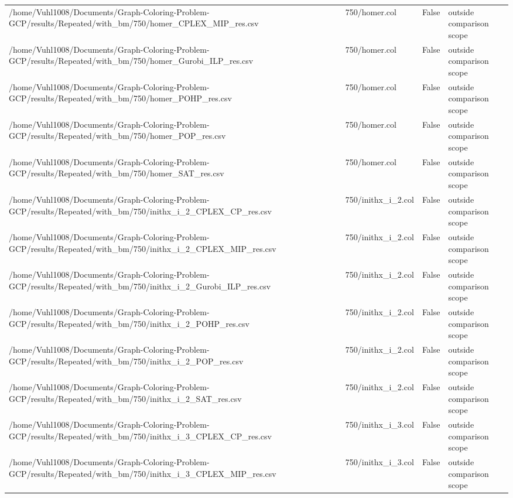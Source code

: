 \begin{table}[htbp]
\begin{tabular}{llll}
/home/Vuhl1008/Documents/Graph-Coloring-Problem-GCP/results/Repeated/with\_bm/750/homer\_CPLEX\_MIP\_res.csv & 750/homer.col & False & outside comparison scope \\
/home/Vuhl1008/Documents/Graph-Coloring-Problem-GCP/results/Repeated/with\_bm/750/homer\_Gurobi\_ILP\_res.csv & 750/homer.col & False & outside comparison scope \\
/home/Vuhl1008/Documents/Graph-Coloring-Problem-GCP/results/Repeated/with\_bm/750/homer\_POHP\_res.csv & 750/homer.col & False & outside comparison scope \\
/home/Vuhl1008/Documents/Graph-Coloring-Problem-GCP/results/Repeated/with\_bm/750/homer\_POP\_res.csv & 750/homer.col & False & outside comparison scope \\
/home/Vuhl1008/Documents/Graph-Coloring-Problem-GCP/results/Repeated/with\_bm/750/homer\_SAT\_res.csv & 750/homer.col & False & outside comparison scope \\
/home/Vuhl1008/Documents/Graph-Coloring-Problem-GCP/results/Repeated/with\_bm/750/inithx\_i\_2\_CPLEX\_CP\_res.csv & 750/inithx\_i\_2.col & False & outside comparison scope \\
/home/Vuhl1008/Documents/Graph-Coloring-Problem-GCP/results/Repeated/with\_bm/750/inithx\_i\_2\_CPLEX\_MIP\_res.csv & 750/inithx\_i\_2.col & False & outside comparison scope \\
/home/Vuhl1008/Documents/Graph-Coloring-Problem-GCP/results/Repeated/with\_bm/750/inithx\_i\_2\_Gurobi\_ILP\_res.csv & 750/inithx\_i\_2.col & False & outside comparison scope \\
/home/Vuhl1008/Documents/Graph-Coloring-Problem-GCP/results/Repeated/with\_bm/750/inithx\_i\_2\_POHP\_res.csv & 750/inithx\_i\_2.col & False & outside comparison scope \\
/home/Vuhl1008/Documents/Graph-Coloring-Problem-GCP/results/Repeated/with\_bm/750/inithx\_i\_2\_POP\_res.csv & 750/inithx\_i\_2.col & False & outside comparison scope \\
/home/Vuhl1008/Documents/Graph-Coloring-Problem-GCP/results/Repeated/with\_bm/750/inithx\_i\_2\_SAT\_res.csv & 750/inithx\_i\_2.col & False & outside comparison scope \\
/home/Vuhl1008/Documents/Graph-Coloring-Problem-GCP/results/Repeated/with\_bm/750/inithx\_i\_3\_CPLEX\_CP\_res.csv & 750/inithx\_i\_3.col & False & outside comparison scope \\
/home/Vuhl1008/Documents/Graph-Coloring-Problem-GCP/results/Repeated/with\_bm/750/inithx\_i\_3\_CPLEX\_MIP\_res.csv & 750/inithx\_i\_3.col & False & outside comparison scope \\

\end{tabular}
\end{table}

